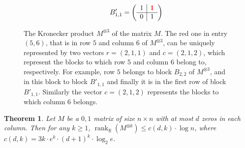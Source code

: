 \documentclass[10pt,a4paper]{amsart}
\newtheorem{theorem}{Theorem}
\newcommand{\Rbool}{{\rank}_\mathbb{B}}
\newcommand{\rank}{\mathop{\mathrm{rank}}}
\begin{document}
\begin{figure}[htb!]
$$\;\;\;\;\;\;\;\;\;
B'_{1,1} = \left(
\begin{array}{c|c}
   1 & \textcolor{red}{\bf 1} \\\hline
  0 & 1
  \end{array}\right)
$$
\endgroup
\caption{The Kronecker product $M^{\otimes 3}$ of the matrix $M$.
The red one in entry $(5,6)$, that is in row $5$ and column $6$ of $M^{\otimes 3}$,
can be uniquely represented by two vectors $r = (2,1,1)$ and $c = (2,1,2)$, which represent the blocks to which row $5$ and column $6$ belong to, respectively.
For example, row $5$ belongs to block $B_{2,2}$ of $M^{\otimes 3}$, and in this
block to block $B'_{1,1}$ and finally it is in the first row of block $B'_{1,1}$.
Similarly the vector $c = (2,1,2)$ represents the blocks to which column $6$ belongs.}
\label{fig-kronekerblocks}
\end{figure}

\begin{theorem}
\label{theo-block}
Let $M$ be a $0,1$ matrix of size $n \times n$ with at most $d$ zeros in each column. Then for any $k \geq 1$,
$\Rbool(M^{\otimes k}) \leq c(d,k) \cdot \log n$, where $c(d,k)  = 3k\cdot e^k \cdot (d+1)^k \cdot \log_2 e$.
\end{theorem}
\end{document}
